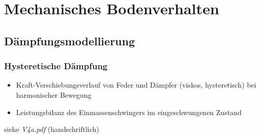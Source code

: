 \documentclass[hyperref={pdfpagemode=FullScreen, colorlinks=false}]{beamer}
\begin{document}
\maketitle

\section{Mechanisches Bodenverhalten}

\subsection{Dämpfungsmodellierung}
\begin{frame}
\frametitle{Hysteretische Dämpfung}
\begin{itemize}
 \item Kraft-Verschiebungsverlauf von Feder und Dämpfer (viskos, hysteretisch) bei harmonischer Bewegung
 \item Leistungsbilanz des Einmassenschwingers im eingeschwungenen Zustand
\end{itemize}
\vfill

\hfill siehe \textsl{V4a.pdf} (handschriftlich)
\end{frame}

\end{document}
